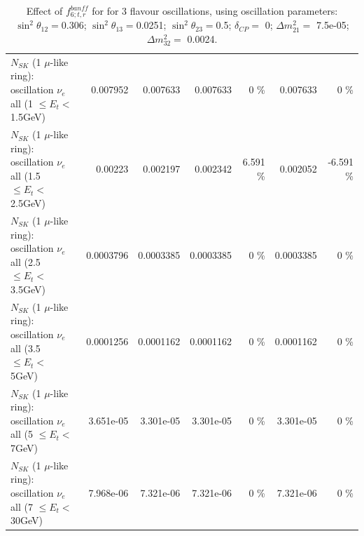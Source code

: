 \begin{table}
\begin{tabular}{| l | r | r | r  r | r  r |}
$N_{SK}$ (1 $\mu$-like ring): oscillation $\nu_{e}$ all (1 $\leq E_{t} <$ 1.5GeV) &        0.007952 &        0.007633 &        0.007633 &        0 \%  &        0.007633 &        0 \%  \\ 
$N_{SK}$ (1 $\mu$-like ring): oscillation $\nu_{e}$ all (1.5 $\leq E_{t} <$ 2.5GeV) &         0.00223 &        0.002197 &        0.002342 &    6.591 \%  &        0.002052 &   -6.591 \%  \\ 
$N_{SK}$ (1 $\mu$-like ring): oscillation $\nu_{e}$ all (2.5 $\leq E_{t} <$ 3.5GeV) &       0.0003796 &       0.0003385 &       0.0003385 &        0 \%  &       0.0003385 &        0 \%  \\ 
$N_{SK}$ (1 $\mu$-like ring): oscillation $\nu_{e}$ all (3.5 $\leq E_{t} <$ 5GeV) &       0.0001256 &       0.0001162 &       0.0001162 &        0 \%  &       0.0001162 &        0 \%  \\ 
 $N_{SK}$ (1 $\mu$-like ring): oscillation $\nu_{e}$ all (5 $\leq E_{t} <$ 7GeV) &       3.651e-05 &       3.301e-05 &       3.301e-05 &        0 \%  &       3.301e-05 &        0 \%  \\ 
$N_{SK}$ (1 $\mu$-like ring): oscillation $\nu_{e}$ all (7 $\leq E_{t} <$ 30GeV) &       7.968e-06 &       7.321e-06 &       7.321e-06 &        0 \%  &       7.321e-06 &        0 \%  \\ 
\hline
\hline
\end{tabular}
\caption{ Effect of $f_{6; t, r}^{banff}$ for for 3 flavour oscillations, using oscillation parameters:  $\sin^2\theta_{12} = $0.306; $\sin^2\theta_{13} = $0.0251; $\sin^2\theta_{23} = $0.5; $\delta_{CP} = $        0; $\Delta m^2_{21} = $    7.5e-05; $\Delta m^2_{32} = $    0.0024. }
\label{tab:num_banff_06_1RmuT_3f_osc_t13:0.0251}
\end{table}
\clearpage

